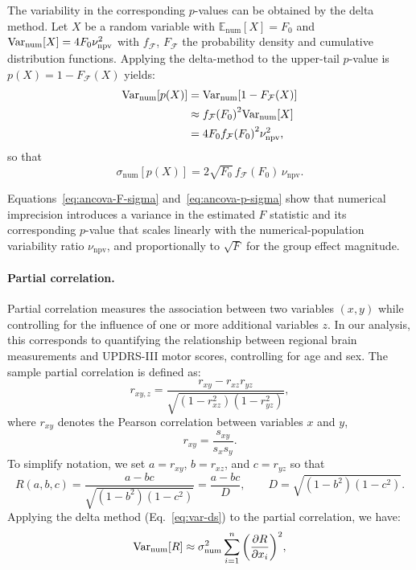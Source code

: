 \vspace{0.4em}
\noindent
The variability in the corresponding $p$-values can be obtained by the delta
method. Let $X$ be a random variable with $\mathbb{E}_{\mathrm{num}}[X]=F_0$ and
$\mathrm{Var}_{\mathrm{num}}[X]=4F_0\nu_{\mathrm{npv}}^{2}$ with $f_{\mathcal{F}}$,
$F_{\mathcal{F}}$ the probability density and cumulative distribution functions.
Applying the delta-method to the upper-tail $p$-value is $p(X) = 1 -
    F_{\mathcal{F}}(X)$ yields:
\begin{align*}
    \mathrm{Var}_{\mathrm{num}}[p(X)] & = \mathrm{Var}_{\mathrm{num}}[1 - F_{\mathcal{F}}(X)]            \\
                              & \approx {f_{\mathcal{F}}(F_0)}^{2}\mathrm{Var}_{\mathrm{num}}[X] \\
                              & = 4F_0{f_{\mathcal{F}}(F_0)}^{2}\nu_{\mathrm{npv}}^{2},
\end{align*}
so that
\begin{equation}
    \sigma_{\mathrm{num}}[p(X)] = 2\sqrt{F_0}\,f_{\mathcal{F}}(F_0)\,\nu_{\mathrm{npv}}.
    \label{eq:ancova-p-sigma}
\end{equation}

Equations~\eqref{eq:ancova-F-sigma} and~\eqref{eq:ancova-p-sigma} show that
numerical imprecision introduces a variance in the estimated $F$ statistic and
its corresponding $p$-value that scales linearly with the numerical-population
variability ratio $\nu_{\mathrm{npv}}$, and proportionally to $\sqrt{F}$ for
the group effect magnitude.

\paragraph{Partial correlation.}

Partial correlation measures the association between two variables $(x,y)$
while controlling for the influence of one or more additional variables $z$. In
our analysis, this corresponds to quantifying the relationship between regional
brain measurements and UPDRS-III motor scores, controlling for age and sex. The
sample partial correlation is defined as:
\begin{equation*}
    r_{xy,z}
    =
    \frac{r_{xy} - r_{xz}r_{yz}}
    {\sqrt{(1 - r_{xz}^{2})(1 - r_{yz}^{2})}},
    \label{eq:partial-r-def}
\end{equation*}
where $r_{xy}$ denotes the Pearson correlation between variables $x$ and $y$,
\[
    r_{xy} = \frac{s_{xy}}{s_x s_y}.
\]
To simplify notation, we set $a = r_{xy}$, $b = r_{xz}$, and $c = r_{yz}$ so
that
\[
    R(a,b,c)
    = \frac{a - bc}{\sqrt{(1 - b^{2})(1 - c^{2})}}
    = \frac{a - bc}{D},
    \qquad
    D = \sqrt{(1 - b^{2})(1 - c^{2})}.
\]
Applying the delta method (Eq.~\ref{eq:var-ds}) to the partial correlation, we
have:
\begin{equation}
    \mathrm{Var}_{\mathrm{num}}[R] \approx \sigma_{\mathrm{num}}^{2} \sum_{i=1}^{n} {\left(\frac{\partial R}{\partial x_i}\right)}^{2},
    \label{eq:delta-partial}
\end{equation}

